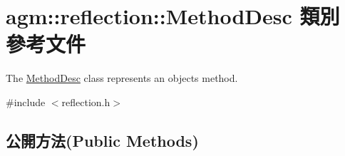 \hypertarget{classagm_1_1reflection_1_1_method_desc}{}\section{agm\+:\+:reflection\+:\+:Method\+Desc 類別 參考文件}
\label{classagm_1_1reflection_1_1_method_desc}


The \hyperlink{classagm_1_1reflection_1_1_method_desc}{Method\+Desc} class represents an object\textquotesingle{}s method.  




{\ttfamily \#include $<$reflection.\+h$>$}

\subsection*{公開方法(Public Methods)}
